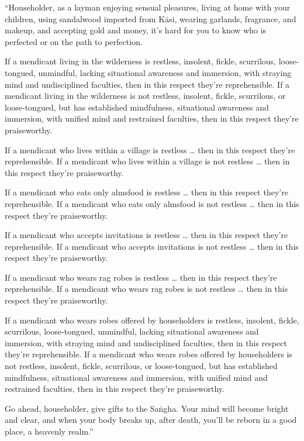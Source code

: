 \documentclass[12pt,openany]{book}%
\begin{document}
“Householder, as a layman enjoying sensual pleasures, living at home with your children, using sandalwood imported from \textsanskrit{Kāsi}, wearing garlands, fragrance, and makeup, and accepting gold and money, it’s hard for you to know who is perfected or on the path to perfection. 

If a mendicant living in the wilderness is restless, insolent, fickle, scurrilous, loose-tongued, unmindful, lacking situational awareness and immersion, with straying mind and undisciplined faculties, then in this respect they’re reprehensible. If a mendicant living in the wilderness is not restless, insolent, fickle, scurrilous, or loose-tongued, but has established mindfulness, situational awareness and immersion, with unified mind and restrained faculties, then in this respect they’re praiseworthy. 

If a mendicant who lives within a village is restless … then in this respect they’re reprehensible. If a mendicant who lives within a village is not restless … then in this respect they’re praiseworthy. 

If a mendicant who eats only almsfood is restless … then in this respect they’re reprehensible. If a mendicant who eats only almsfood is not restless … then in this respect they’re praiseworthy. 

If a mendicant who accepts invitations is restless … then in this respect they’re reprehensible. If a mendicant who accepts invitations is not restless … then in this respect they’re praiseworthy. 

If a mendicant who wears rag robes is restless … then in this respect they’re reprehensible. If a mendicant who wears rag robes is not restless … then in this respect they’re praiseworthy. 

If a mendicant who wears robes offered by householders is restless, insolent, fickle, scurrilous, loose-tongued, unmindful, lacking situational awareness and immersion, with straying mind and undisciplined faculties, then in this respect they’re reprehensible. If a mendicant who wears robes offered by householders is not restless, insolent, fickle, scurrilous, or loose-tongued, but has established mindfulness, situational awareness and immersion, with unified mind and restrained faculties, then in this respect they’re praiseworthy. 

Go ahead, householder, give gifts to the \textsanskrit{Saṅgha}. Your mind will become bright and clear, and when your body breaks up, after death, you’ll be reborn in a good place, a heavenly realm.” 
\end{document}
